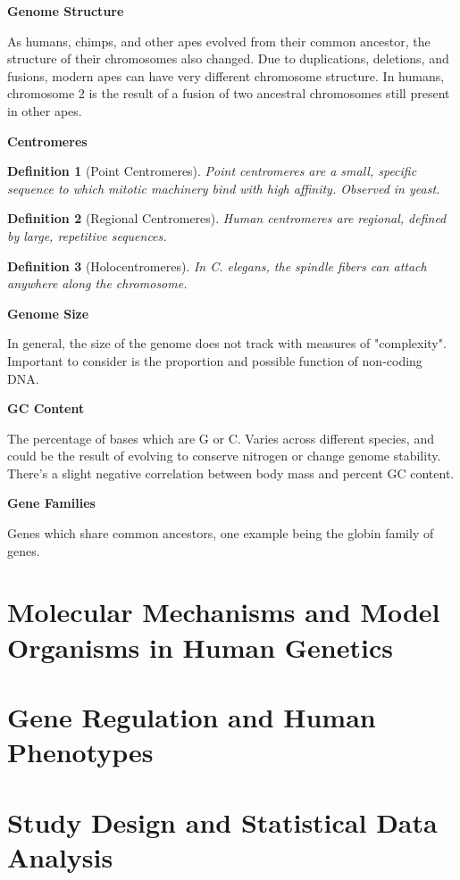 \documentclass{tufte-handout}
\theoremstyle{noparens}
\newtheorem*{define}{Definition}
\begin{document}
\textbf{Genome Structure}

As humans, chimps, and other apes evolved from their common ancestor, the structure of their chromosomes also changed. Due to duplications, deletions, and fusions, modern apes can have very different chromosome structure. In humans, chromosome 2 is the result of a fusion of two ancestral chromosomes still present in other apes.

\textbf{Centromeres}

\begin{define}[Point Centromeres]
Point centromeres are a small, specific sequence to which mitotic machinery bind with high affinity. Observed in yeast.
\end{define}

\begin{define}[Regional Centromeres]
Human centromeres are regional, defined by large, repetitive sequences.
\end{define}

\begin{define}[Holocentromeres]
In \emph{C. elegans}, the spindle fibers can attach anywhere along the chromosome.
\end{define}

\textbf{Genome Size}

In general, the size of the genome does not track with measures of "complexity". Important to consider is the proportion and possible function of non-coding DNA.

\textbf{GC Content}

The percentage of bases which are G or C. Varies across different species, and could be the result of evolving to conserve nitrogen or change genome stability. There's a slight negative correlation between body mass and percent GC content.

\textbf{Gene Families}

Genes which share common ancestors, one example being the globin family of genes.

\section{Molecular Mechanisms and Model Organisms in Human Genetics}\label{sec:molecmech}

\section{Gene Regulation and Human Phenotypes}\label{sec:genreg}

\section{Study Design and Statistical Data Analysis}\label{sec:stats}
\end{document}
